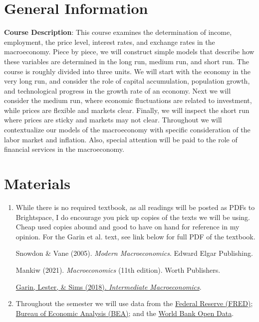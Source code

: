 \documentclass[11pt]{article}
\begin{document}
			\section{General Information}
			
			\textbf{Course Description}: This course examines the determination of income, employment, the price level, interest rates, and exchange rates in the macroeconomy. Piece by piece, we will construct simple models that describe how these variables are determined in the long run, medium run, and short run. The course is roughly divided into three units. We will start with the economy in the very long run, and consider the role of capital accumulation, population growth, and technological progress in the growth rate of an economy. Next we will consider the medium run, where economic fluctuations are related to investment, while prices are flexible and markets clear. Finally, we will inspect the short run where prices are sticky and markets may not clear. Throughout we will contextualize our models of the macroeconomy with specific consideration of the labor market and inflation. Also, special attention will be paid to the role of financial services in the macroeconomy. 
			
	\section{Materials}
	
	\begin{enumerate}
		
		\item While there is no required textbook, as all readings will be posted as PDFs to Brightspace, I do encourage you pick up copies of the texts we will be using. Cheap used copies abound and good to have on hand for reference in my opinion. For the Garin et al. text, see link below for full PDF of the textbook.
		
		\subitem Snowdon \& Vane (2005). \textit{Modern Macroeconomics}. Edward Elgar Publishing.
		
		\subitem Mankiw (2021). \textit{Macroeconomics} (11th edition). Worth Publishers.
		
		\subitem \href{https://www3.nd.edu/~esims1/gls_textbook.html}{Garin, Lester, \& Sims (2018). \textit{Intermediate Macroeconomics}}. 
		
		
		\vspace{0.05in}
		
		\item Throughout the semester we will use data from the \href{https://fred.stlouisfed.org/}{Federal Reserve (FRED)}; \href{https://www.bea.gov/}{Bureau of Economic Analysis (BEA)}; and the \href{https://data.worldbank.org/}{World Bank Open Data}.
	\end{enumerate}
	
\end{document}

